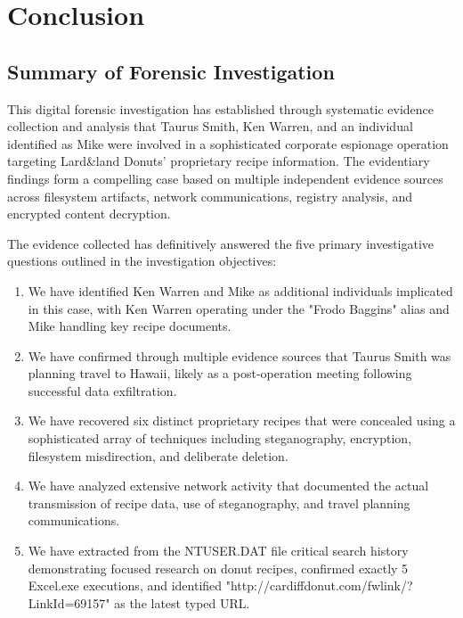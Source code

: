 \chapter{Conclusion}

\section{Summary of Forensic Investigation}
This digital forensic investigation has established through systematic evidence collection and analysis that Taurus Smith, Ken Warren, and an individual identified as Mike were involved in a sophisticated corporate espionage operation targeting Lard\&land Donuts' proprietary recipe information. The evidentiary findings form a compelling case based on multiple independent evidence sources across filesystem artifacts, network communications, registry analysis, and encrypted content decryption.

The evidence collected has definitively answered the five primary investigative questions outlined in the investigation objectives:

\begin{enumerate}
    \item We have identified Ken Warren and Mike as additional individuals implicated in this case, with Ken Warren operating under the "Frodo Baggins" alias and Mike handling key recipe documents.
    
    \item We have confirmed through multiple evidence sources that Taurus Smith was planning travel to Hawaii, likely as a post-operation meeting following successful data exfiltration.
    
    \item We have recovered six distinct proprietary recipes that were concealed using a sophisticated array of techniques including steganography, encryption, filesystem misdirection, and deliberate deletion.
    
    \item We have analyzed extensive network activity that documented the actual transmission of recipe data, use of steganography, and travel planning communications.
    
    \item We have extracted from the NTUSER.DAT file critical search history demonstrating focused research on donut recipes, confirmed exactly 5 Excel.exe executions, and identified "http://cardiffdonut.com/fwlink/?LinkId=69157" as the latest typed URL.
\end{enumerate}

